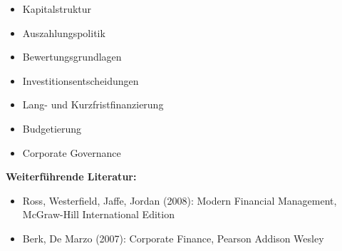 \begin{course}
\begin{content}
 \begin{itemize}\item Kapitalstruktur  \item Auszahlungspolitik  \item Bewertungsgrundlagen  \item Investitionsentscheidungen  \item Lang- und Kurzfristfinanzierung  \item Budgetierung  \item Corporate Governance  \end{itemize}
\end{content}



\begin{literature}\textbf{Weiterführende Literatur:}

 \begin{itemize}\item Ross, Westerfield, Jaffe, Jordan (2008): Modern Financial Management, McGraw-Hill International Edition  \item Berk, De Marzo (2007): Corporate Finance, Pearson Addison Wesley  \end{itemize}\end{literature}



\end{course}